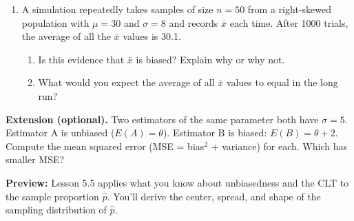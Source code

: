\documentclass[10pt]{article}
\begin{document}
\begin{enumerate}
  \newpage
  \item A simulation repeatedly takes samples of size $n = 50$ from a right-skewed
        population with $\mu = 30$ and $\sigma = 8$ and records $\bar{x}$ each time.
        After 1000 trials, the average of all the $\bar{x}$ values is 30.1.
        \begin{enumerate}[label=\alph*.]
          \item Is this evidence that $\bar{x}$ is biased? Explain why or why not.
          \item What would you expect the average of all $\bar{x}$ values to equal
                in the long run?
                \gradedright{\gradedblank[id=hw3b, type=short, points=1, answer=30, check=numeric, tolerance=0]{1.1in}{0.17in}}
        \end{enumerate}

\end{enumerate}

\begin{extensionbox}
\textbf{Extension (optional).}
Two estimators of the same parameter both have $\sigma = 5$. Estimator A is unbiased
($E(A) = \theta$). Estimator B is biased: $E(B) = \theta + 2$. Compute the mean
squared error (MSE = bias$^2$ + variance) for each. Which has smaller MSE?
\end{extensionbox}

\begin{reflectionbox}
\textbf{Preview:} Lesson 5.5 applies what you know about unbiasedness and the CLT to the
sample proportion $\hat{p}$. You'll derive the center, spread, and shape of the
sampling distribution of $\hat{p}$.
\end{reflectionbox}
\end{document}
